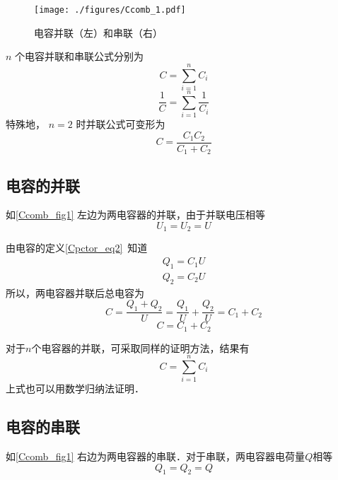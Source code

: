 

\begin{figure}[ht]
\centering
\texttt{[image: ./figures/Ccomb\_1.pdf]}
\caption{电容并联（左）和串联（右）} \label{Ccomb_fig1}
\end{figure}

$n$ 个电容并联和串联公式分别为
\begin{equation}
C=\sum_{i=1}^{n}C_i
\end{equation}
\begin{equation}
\frac{1}{C}=\sum_{i=1}^{n}\frac{1}{C_i}
\end{equation}
特殊地， $n = 2$ 时并联公式可变形为
\begin{equation}
C = \frac{C_1 C_2}{C_1 + C_2}
\end{equation}


\subsection{电容的并联}
如\autoref{Ccomb_fig1} 左边为两电容器的并联，由于并联电压相等
\begin{equation}
U_1=U_2=U
\end{equation}

由电容的定义\autoref{Cpctor_eq2}~知道
\begin{equation}
\begin{aligned}
Q_1=C_1U\\
Q_2=C_2U
\end{aligned}
\end{equation}
所以，两电容器并联后总电容为
\begin{equation}
C=\frac{Q_1+Q_2}{U}=\frac{Q_1}{U}+\frac{Q_2}{U}=C_1+C_2
\end{equation}
\begin{equation}
C = C_1 + C_2
\end{equation}

对于$n$个电容器的并联，可采取同样的证明方法，结果有
\begin{equation}
C=\sum_{i=1}^{n}C_i
\end{equation}
上式也可以用数学归纳法证明．

\subsection{电容的串联}
如\autoref{Ccomb_fig1} 右边为两电容器的串联．对于串联，两电容器电荷量$Q$相等
\begin{equation}
Q_1=Q_2=Q
\end{equation}

